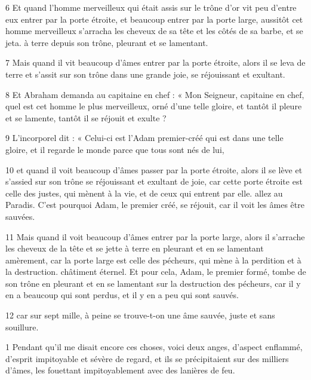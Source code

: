\par 6 Et quand l'homme merveilleux qui était assis sur le trône d'or vit peu d'entre eux entrer par la porte étroite, et beaucoup entrer par la porte large, aussitôt cet homme merveilleux s'arracha les cheveux de sa tête et les côtés de sa barbe, et se jeta. à terre depuis son trône, pleurant et se lamentant.

\par 7 Mais quand il vit beaucoup d'âmes entrer par la porte étroite, alors il se leva de terre et s'assit sur son trône dans une grande joie, se réjouissant et exultant.

\par 8 Et Abraham demanda au capitaine en chef : « Mon Seigneur, capitaine en chef, quel est cet homme le plus merveilleux, orné d'une telle gloire, et tantôt il pleure et se lamente, tantôt il se réjouit et exulte ?

\par 9 L'incorporel dit : « Celui-ci est l'Adam premier-créé qui est dans une telle gloire, et il regarde le monde parce que tous sont nés de lui,

\par 10 et quand il voit beaucoup d'âmes passer par la porte étroite, alors il se lève et s'assied sur son trône se réjouissant et exultant de joie, car cette porte étroite est celle des justes, qui mènent à la vie, et de ceux qui entrent par elle. allez au Paradis. C'est pourquoi Adam, le premier créé, se réjouit, car il voit les âmes être sauvées.

\par 11 Mais quand il voit beaucoup d'âmes entrer par la porte large, alors il s'arrache les cheveux de la tête et se jette à terre en pleurant et en se lamentant amèrement, car la porte large est celle des pécheurs, qui mène à la perdition et à la destruction. châtiment éternel. Et pour cela, Adam, le premier formé, tombe de son trône en pleurant et en se lamentant sur la destruction des pécheurs, car il y en a beaucoup qui sont perdus, et il y en a peu qui sont sauvés.

\par 12 car sur sept mille, à peine se trouve-t-on une âme sauvée, juste et sans souillure.


\par 1 Pendant qu'il me disait encore ces choses, voici deux anges, d'aspect enflammé, d'esprit impitoyable et sévère de regard, et ils se précipitaient sur des milliers d'âmes, les fouettant impitoyablement avec des lanières de feu.

